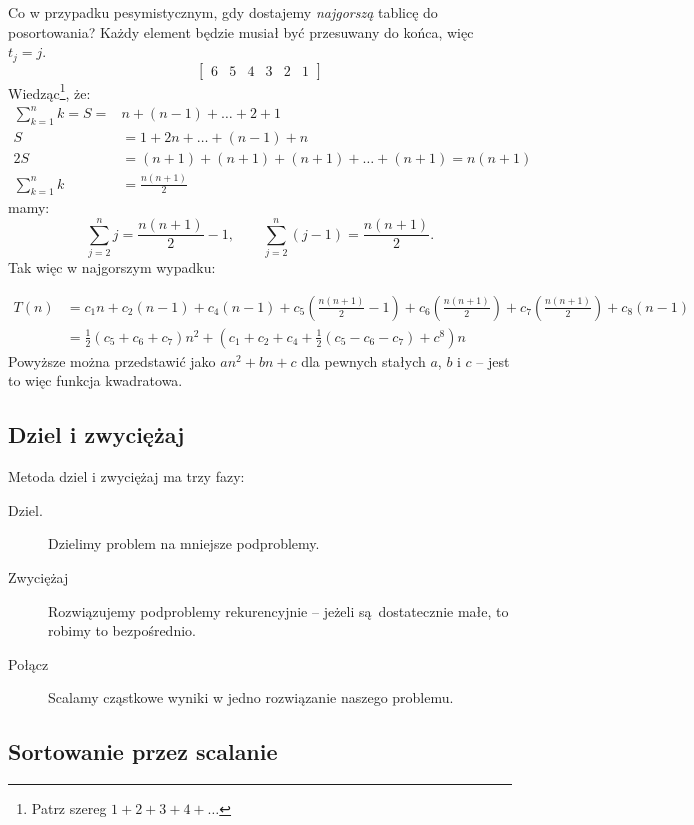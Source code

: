 \documentclass[10pt, oneside]{article}
\theoremstyle{remark}
\begin{document}
Co w przypadku pesymistycznym, gdy dostajemy \emph{najgorszą} tablicę do posortowania? Każdy element będzie musiał być przesuwany do końca, więc $t_j = j$.
$$
\begin{bmatrix}
	6 & 5 & 4 & 3 & 2 & 1
\end{bmatrix}$$
Wiedząc\footnote{Patrz szereg $1+2+3+4+\ldots$}, że:
\begin{align*}
\sum_{k=1}^n k = S =& n + (n-1) + \ldots + 2 + 1\\
S &= 1 + 2 n + \ldots + (n-1) + n\\
2S &= (n+1) + (n+1) + (n+1) + \ldots + (n+1) = n(n+1)\\
\sum_{k=1}^n k &= \frac{n(n+1)}{2}
\end{align*}
mamy:
$$\sum_{j=2}^n j = \frac{n(n+1)}{2} - 1, \qquad \sum_{j=2}^n \left(j - 1 \right) = \frac{n(n+1)}{2}.$$
Tak więc w najgorszym wypadku:

\begin{align*}
T(n) &= c_{1}n + c_2 (n-1) + c_4 (n-1) + c_5 \left ( \frac{n(n+1)}{2} - 1 \right ) + c_6 \left ( \frac{n(n+1)}{2} \right ) + c_7 \left ( \frac{n(n+1)}{2} \right ) + c_8 (n-1)\\
&= \frac{1}{2} \left(c_5 + c_6 + c_7 \right) n^2 + \left(c_1 + c_2 +c_4 + \frac{1}{2} \left(c_5 - c_6 - c_7\right) + c^8 \right)n
\end{align*}
Powyższe można przedstawić jako $an^2 + bn + c$ dla pewnych stałych $a$, $b$ i $c$ -- jest to więc funkcja kwadratowa.

\subsection{Dziel i zwyciężaj}

Metoda dziel i zwyciężaj ma trzy fazy:
\begin{description}
	\item[Dziel.] Dzielimy problem na mniejsze podproblemy.
	\item[Zwyciężaj] Rozwiązujemy podproblemy rekurencyjnie -- jeżeli są dostatecznie małe, to robimy to bezpośrednio.
	\item[Połącz] Scalamy cząstkowe wyniki w jedno rozwiązanie naszego problemu.
\end{description}

\subsection{Sortowanie przez scalanie}
\end{document}
